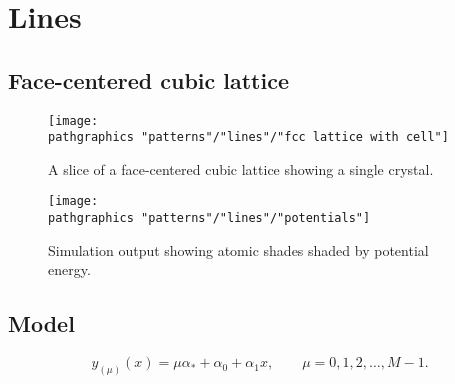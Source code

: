 \chapter{Lines}

\section{Face-centered cubic lattice} %

\begin{figure}[htbp] %
   \centering
   \texttt{[image: \\pathgraphics "patterns"/"lines"/"fcc lattice with cell"]} 
   \caption{A slice of a face-centered cubic lattice showing a single crystal.}
   \label{fig:pattern fcc}
\end{figure}

\begin{figure}[htbp] %
   \centering
   \texttt{[image: \\pathgraphics "patterns"/"lines"/"potentials"]} 
   \caption{Simulation output showing atomic shades shaded by potential energy.}
   \label{fig:pattern potentials}
\end{figure}

\section{Model}  %

\begin{equation}
    y_{(\mu)}(x) = \mu \alpha_{*} + \alpha_{0} + \alpha_{1} x, \qquad \mu = 0,1,2,\dots,M-1 .
    \label{eq:trial coupled}
\end{equation}

